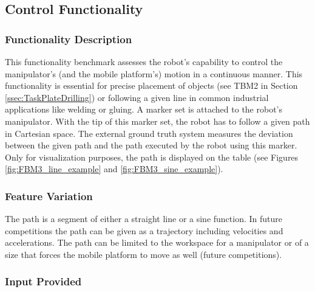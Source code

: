

\subsection{Control Functionality}
\label{ssec:Control}
\subsubsection{Functionality Description}
\label{sssec:ControlDescription}
This functionality benchmark assesses the robot's capability to control the manipulator's (and the mobile platform's) motion in a continuous manner. This functionality is essential for precise placement of objects (see TBM2 in Section \ref{ssec:TaskPlateDrilling}) or following a given line in common industrial applications like welding or gluing.
A marker set is attached to the robot's manipulator. With the tip of this marker set, the robot has to follow a given path in Cartesian space. The external ground truth system measures the deviation between the given path and the path executed by the robot using this marker.
Only for visualization purposes, the path is displayed on the table (see Figures \ref{fig:FBM3_line_example} and \ref{fig:FBM3_sine_example}).


\subsubsection{Feature Variation}
\label{sssec:ControlVariation}

The path is a segment of either a straight line or a sine function.
In future competitions the path can be given as a trajectory including velocities and accelerations.
The path can be limited to the workspace for a manipulator or of a size that forces the mobile platform to move as well (future competitions).

\subsubsection{Input Provided}
\label{sssec:ControlInput}

